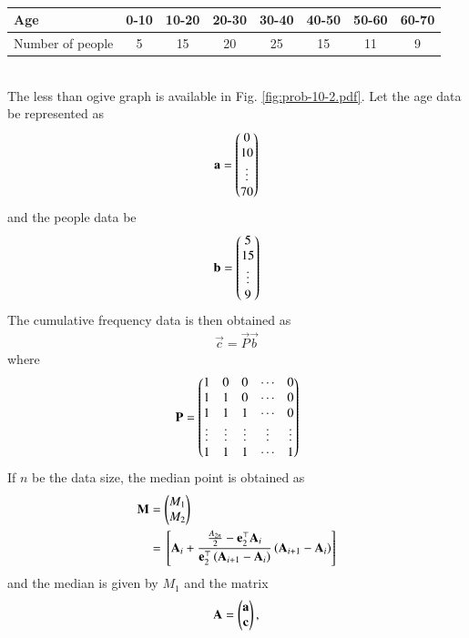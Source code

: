 \documentclass[journal,12pt,twocolumn]{IEEEtran}
\renewcommand\thesection{\arabic{section}}
\begin{document}
\begin{enumerate}[label=\thesection.\arabic*.,ref=\thesection.\theenumi]
\begin{table}[!hb]
{%
    \begin{tabular}{|l|c|c|c|c|c|c|c|}
        \hline
        Age & 0-10 & 10-20 & 20-30 & 30-40 & 40-50 & 50-60 & 60-70  \\
        \hline
        Number of people & 5 & 15 & 20 & 25 & 15 & 11 & 9\\
        \hline
    \end{tabular}
    }
			\caption{}
			\label{table:prob-10-2}
		\end{table}
		\\
		\solution  The less than ogive graph is available in Fig. 
	  \ref{fig:prob-10-2.pdf}.  Let the age data be represented as
		\begin{align}
			\mathbf{a} = \begin{pmatrix}0 \\ 10 \\ \vdots \\ 70\end{pmatrix}
		\end{align}
		and the people data be 
		\begin{align}
			\mathbf{b} = \begin{pmatrix}5 \\ 15 \\ \vdots \\ 9\end{pmatrix}
		\end{align}
		The  cumulative frequency data is then obtained as 
		\begin{align}
			\vec{c} = \vec{P} \vec{b}
		\end{align}
		where 
		\begin{align}
			\mathbf{P} =\begin{pmatrix}
				1 & 0 & 0 &\cdots & 0
			\\
				1 & 1 &  0 & \cdots & 0
			\\
				1 & 1 & 1 &\cdots & 0
			\\
			\vdots & 
			\vdots & 
			\vdots & 
			\vdots & 
			\vdots  
			\\
				1 & 1 & 1 &\cdots & 1 
			\\
			\end{pmatrix}
		\end{align}
		If $n$ be the data size,  the median point is obtained as 
		\begin{align}
			\mathbf{M} &= \begin{pmatrix}M_1 \\ M_2\end{pmatrix}
			\\
			&={}\left[\mathbf{A}_i + \frac{\frac{A_{2n}}{2} -\mathbf{e}_2^{\top}  \mathbf{A}_i }{\mathbf{e}_2^{\top}\left(\mathbf{A}_{i+1} -\mathbf{A}_i \right)}\left(\mathbf{A}_{i+1} -\mathbf{A}_i \right)\right]
		\end{align}
		and the median is given by $M_1$ and the matrix
		\begin{align}
			\vec{A} = \myvec{\vec{a} \\ \vec{c}},

\end{align}
\end{enumerate}
\end{document}
